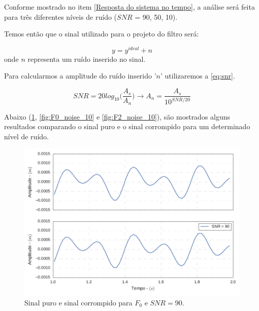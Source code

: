 Conforme mostrado no item \ref{Resposta do sistema no tempo}, a análise será feita para três diferentes níveis de ruído ($ SNR $ = 90, 50, 10). 

Temos então que o sinal utilizado para o projeto do filtro será:

\begin{equation}
y = y^{ideal} + n
\end{equation}
onde $ n $ representa um ruído inserido no sinal.

Para calcularmos a amplitude do ruído inserido '$ n $' utilizaremos a \cref{eq:snr}.

\begin{equation} \label{eq:snr}
SNR = 20log_{10}\Bigg(\frac{A_s}{A_n}\Bigg) \rightarrow A_n = \frac{A_s}{10^{SNR/20}}
\end{equation}

Abaixo (\cref{fig:F0_noise_90}, \cref{fig:F0_noise_10} e \cref{fig:F2_noise_10}), são mostrados alguns resultados comparando o sinal puro e o sinal corrompido para um determinado nível de ruído.

\begin{figure}
	\centering
	\includegraphics[scale=0.6]{IMGS/F0_noise_90}
	\caption{Sinal puro e sinal corrompido para $ F_0 $ e $ SNR=90 $.}
	\label{fig:F0_noise_90}
\end{figure}

